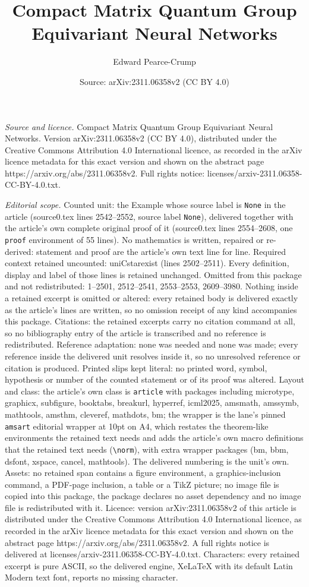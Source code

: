 \documentclass[10pt,a4paper]{amsart}
\title[Compact Matrix Quantum Group Equivariant Neural Networks]{Compact Matrix Quantum Group Equivariant Neural Networks}
\author{Edward Pearce-Crump}
\date{Source: arXiv:2311.06358v2 (CC BY 4.0)}
\begin{document}
\maketitle

\noindent\emph{Source and licence.} Compact Matrix Quantum Group Equivariant Neural Networks. Version arXiv:2311.06358v2 (CC BY 4.0), distributed under the Creative Commons Attribution 4.0 International licence, as recorded in the arXiv licence metadata for this exact version and shown on the abstract page https://arxiv.org/abs/2311.06358v2. Full rights notice: licenses/arxiv-2311.06358-CC-BY-4.0.txt.\par\smallskip

\noindent\textit{Editorial scope.} Counted unit: the Example whose source label is \texttt{None} in the article (source0.tex lines 2542--2552, source label \texttt{None}), delivered together with the article's own complete original proof of it (source0.tex lines 2554--2608, one \texttt{proof} environment of 55 lines). No mathematics is written, repaired or re-derived: statement and proof are the article's own text line for line. Required context retained uncounted: uniCstarexist (lines 2502--2511). Every definition, display and label of those lines is retained unchanged. Omitted from this package and not redistributed: 1--2501, 2512--2541, 2553--2553, 2609--3980. Nothing inside a retained excerpt is omitted or altered: every retained body is delivered exactly as the article's lines are written, so no omission receipt of any kind accompanies this package. Citations: the retained excerpts carry no citation command at all, so no bibliography entry of the article is transcribed and no reference is redistributed. Reference adaptation: none was needed and none was made; every reference inside the delivered unit resolves inside it, so no unresolved reference or citation is produced. Printed slips kept literal: no printed word, symbol, hypothesis or number of the counted statement or of its proof was altered. Layout and class: the article's own class is \texttt{article} with packages including microtype, graphicx, subfigure, booktabs, breakurl, hyperref, icml2025, amsmath, amssymb, mathtools, amsthm, cleveref, mathdots, bm; the wrapper is the lane's pinned \texttt{amsart} editorial wrapper at 10pt on A4, which restates the theorem-like environments the retained text needs and adds the article's own macro definitions that the retained text needs (\texttt{\textbackslash norm}), with extra wrapper packages (bm, bbm, dsfont, xspace, cancel, mathtools). The delivered numbering is the unit's own. Assets: no retained span contains a figure environment, a graphics-inclusion command, a PDF-page inclusion, a table or a TikZ picture; no image file is copied into this package, the package declares no asset dependency and no image file is redistributed with it. Licence: version arXiv:2311.06358v2 of this article is distributed under the Creative Commons Attribution 4.0 International licence, as recorded in the arXiv licence metadata for this exact version and shown on the abstract page https://arxiv.org/abs/2311.06358v2. A full rights notice is delivered at licenses/arxiv-2311.06358-CC-BY-4.0.txt. Characters: every retained excerpt is pure ASCII, so the delivered engine, XeLaTeX with its default Latin Modern text font, reports no missing character.
\end{document}
